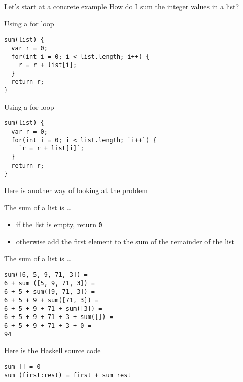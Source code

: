 \begin{frame}
\begin{block}{Let's start at a concrete example}
How do I sum the integer values in a list?
\end{block}
\end{frame}

\begin{frame}[fragile]
\begin{block}{Using a for loop}
\begin{lstlisting}[style=java]
sum(list) {
  var r = 0;
  for(int i = 0; i < list.length; i++) {
    r = r + list[i];
  }
  return r;
}
\end{lstlisting}
\end{block}
\end{frame}

\begin{frame}[fragile]
\begin{block}{Using a for loop}
\begin{lstlisting}[style=java]
sum(list) {
  var r = 0;
  for(int i = 0; i < list.length; `i++`) {
    `r = r + list[i]`;
  }
  return r;
}
\end{lstlisting}
\end{block}
\end{frame}

\begin{frame}
\begin{center}
Here is another way of looking at the problem
\end{center}
\end{frame}

\begin{frame}
\begin{block}{The sum of a list is \ldots}
\begin{itemize}
\item if the list is empty, return \lstinline{0}
\item otherwise add the first element to the sum of the remainder of the list
\end{itemize}
\end{block}
\end{frame}

\begin{frame}[fragile]
\begin{block}{The sum of a list is \ldots}
\begin{lstlisting}
sum([6, 5, 9, 71, 3]) =
6 + sum ([5, 9, 71, 3]) =
6 + 5 + sum([9, 71, 3]) =
6 + 5 + 9 + sum([71, 3]) =
6 + 5 + 9 + 71 + sum([3]) =
6 + 5 + 9 + 71 + 3 + sum([]) =
6 + 5 + 9 + 71 + 3 + 0 =
94
\end{lstlisting}
\end{block}
\end{frame}

\begin{frame}[fragile]
\begin{block}{Here is the Haskell source code}
\begin{lstlisting}[style=haskell]
sum [] = 0
sum (first:rest) = first + sum rest
\end{lstlisting}
\end{block}
\end{frame}
